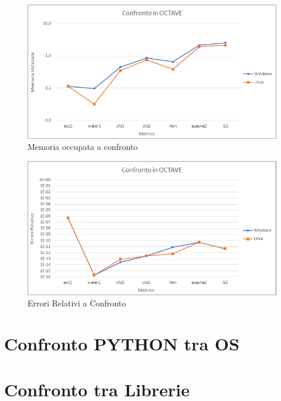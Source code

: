 \documentclass[a4paper,12pt,titlepage,oneside]{book}
\begin{document}
    \begin{figure}[h]
        \centering
        \includegraphics[scale=0.8]{src/plot/MemOCT.png}
        \caption{Memoria occupata a confronto}
        \label{plot:memoct}
    \end{figure}
    
    \begin{figure}[h]
        \centering
        \includegraphics[scale=0.8]{src/plot/ErrOCT.png}
        \caption{Errori Relativi a Confronto}
        \label{plot:erroct}
    \end{figure}
    
    \section{Confronto PYTHON tra OS}
    
    \section{Confronto tra Librerie}
\end{document}
